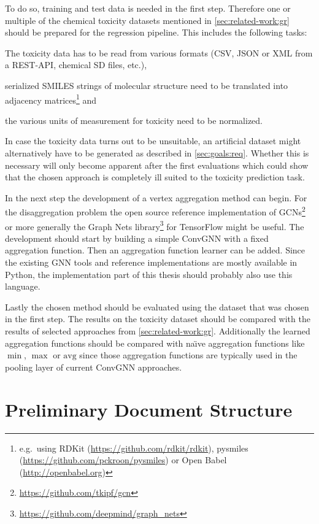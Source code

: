 \documentclass[12pt]{scrartcl}
\begin{document}
To do so, training and test data is needed in the first step.
Therefore one or multiple of the chemical toxicity datasets mentioned in \cref{sec:related-work:gr} should be prepared for the regression pipeline.
This includes the following tasks:
\begin{enumerate*}
	\item The toxicity data has to be read from various formats (CSV, JSON or XML from a REST-API, chemical SD files, etc.),
	\item serialized SMILES strings of molecular structure need to be translated into adjacency matrices\footnote{e.g.\ using RDKit (\url{https://github.com/rdkit/rdkit}), pysmiles (\url{https://github.com/pckroon/pysmiles}) or Open Babel (\url{http://openbabel.org})} and
	\item the various units of measurement for toxicity need to be normalized.
\end{enumerate*}
In case the toxicity data turns out to be unsuitable, an artificial dataset might alternatively have to be generated as described in \cref{sec:goals:req}.
Whether this is necessary will only become apparent after the first evaluations which could show that the chosen approach is completely ill suited to the toxicity prediction task.

In the next step the development of a vertex aggregation method can begin.
For the disaggregation problem the open source reference implementation of GCNs\footnote{\url{https://github.com/tkipf/gcn}} or more generally the Graph Nets library\footnote{\url{https://github.com/deepmind/graph_nets}} for TensorFlow might be useful.
The development should start by building a simple ConvGNN with a fixed aggregation function.
Then an aggregation function learner can be added.
Since the existing GNN tools and reference implementations are mostly available in Python, the implementation part of this thesis should probably also use this language.

Lastly the chosen method should be evaluated using the dataset that was chosen in the first step.
The results on the toxicity dataset should be compared with the results of selected approaches from \cref{sec:related-work:gr}.
Additionally the learned aggregation functions should be compared with na{\"\i}ve aggregation functions like $\min$, $\max$ or $\text{avg}$ since those aggregation functions are typically used in the pooling layer of current ConvGNN approaches.

\section{Preliminary Document Structure}%
\label{sec:doc-structure}
\end{document}
